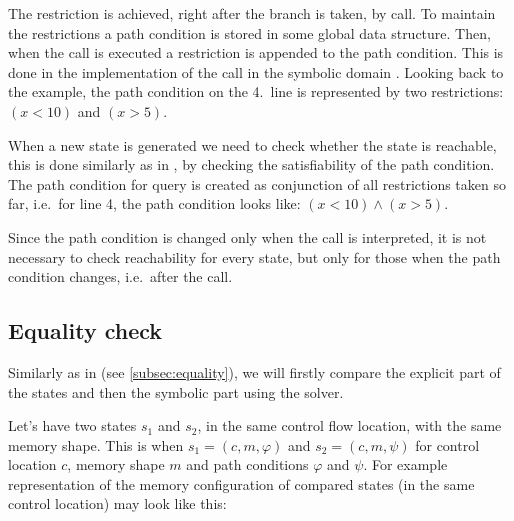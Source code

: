 The restriction is achieved, right after the branch is taken, by
 call. To maintain the restrictions a path condition is stored in
some global data structure. Then, when the  call is executed a
restriction is appended to the path condition. This is done in the
implementation of the  call in the symbolic domain
. Looking back to
the example, the path condition on the 4.~line is represented by two
restrictions: $(x < 10)$ and $(x > 5)$.

When a new state is generated we need to check whether the state is reachable,
this is done similarly as in \SymDIVINE, by checking the satisfiability of the
path condition. The path condition for \SMT query is created as conjunction of
all restrictions taken so far, i.e.~for line 4, the path condition looks like:
$(x < 10) \wedge (x > 5)$.

Since the path condition is changed only when the  call is
interpreted, it is not necessary to check reachability for every state, but only
for those when the path condition changes, i.e.~after the  call.

\subsection{Equality check}

Similarly as in \SymDIVINE (see \autoref{subsec:equality}), we will firstly
compare the explicit part of the states and then the symbolic part using the
\SMT solver.

Let's have two states $s_1$ and $s_2$, in the same control flow location, with
the same memory shape. This is when $s_1 = (c, m, \varphi)$ and $s_2 = (c,
m, \psi)$ for control location $c$, memory shape $m$ and path conditions $\varphi$ and $\psi$.
For example representation of the memory configuration of compared states (in
the same control location) may look like this:

